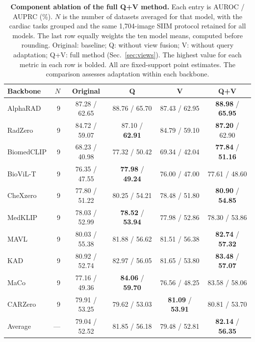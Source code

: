 \begin{table}[t]
\centering
\caption{\textbf{Component ablation of the full Q+V method.} Each entry is AUROC / AUPRC (\%). $N$ is the number of datasets averaged for that model, with the cardiac tasks grouped and the same 1,704-image SIIM protocol retained for all models. The last row equally weights the ten model means, computed before rounding. Original: baseline; Q: without view fusion; V: without query adaptation; Q+V: full method (Sec.~\ref{sec:views}). The highest value for each metric in each row is bolded. All are fixed-support point estimates. The comparison assesses adaptation within each backbone.}
\label{tab:components}
\small
\begin{tabular*}{\textwidth}{@{\extracolsep{\fill}}lrcccc}
\toprule
Backbone & $N$ & Original & Q & V & \textbf{Q+V} \\
\midrule
AlphaRAD & 9 & 87.28 / 62.65 & 88.76 / 65.70 & 87.43 / 62.95 & \textbf{88.98} / \textbf{65.95} \\
RadZero & 9 & 84.72 / 59.07 & 87.10 / \textbf{62.91} & 84.79 / 59.10 & \textbf{87.20} / 62.90 \\
BiomedCLIP & 9 & 68.23 / 40.98 & 77.32 / 50.42 & 69.34 / 42.04 & \textbf{77.84} / \textbf{51.16} \\
BioViL-T & 9 & 76.35 / 47.55 & \textbf{77.98} / \textbf{49.24} & 76.00 / 47.00 & 77.61 / 48.60 \\
CheXzero & 9 & 77.80 / 51.22 & 80.25 / 54.21 & 78.48 / 51.80 & \textbf{80.90} / \textbf{54.85} \\
MedKLIP & 9 & 78.03 / 52.99 & \textbf{78.52} / \textbf{53.94} & 77.98 / 52.86 & 78.30 / 53.86 \\
MAVL & 9 & 80.03 / 55.38 & 81.88 / 56.62 & 81.51 / 56.38 & \textbf{82.74} / \textbf{57.32} \\
KAD & 9 & 80.92 / 52.74 & 82.97 / 56.05 & 81.65 / 53.80 & \textbf{83.48} / \textbf{57.07} \\
MaCo & 9 & 77.16 / 49.36 & \textbf{84.06} / \textbf{59.70} & 76.56 / 48.25 & 83.58 / 58.06 \\
CARZero & 9 & 79.91 / 53.25 & 79.62 / 53.03 & \textbf{81.09} / \textbf{53.91} & 80.81 / 53.70 \\
\midrule
Average & --- & 79.04 / 52.52 & 81.85 / 56.18 & 79.48 / 52.81 & \textbf{82.14} / \textbf{56.35} \\
\bottomrule
\end{tabular*}
\end{table}
